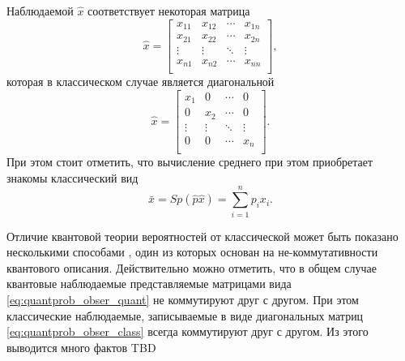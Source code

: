 Наблюдаемой $\hat{x}$ соответствует некоторая матрица
\begin{equation}
\hat{x} = \begin{bmatrix}
x_{11} & x_{12} & \cdots & x_{1n} \\
x_{21} & x_{22} & \cdots & x_{2n} \\
\vdots & \vdots & \ddots & \vdots \\
x_{n1} & x_{n2} & \cdots & x_{nn} \\
\end{bmatrix},
\label{eq:quantprob_obser_quant}
\end{equation}
которая в классическом случае является диагональной 
\begin{equation}
\hat{x} = \begin{bmatrix}
x_1 & 0 & \cdots & 0 \\
0 & x_2 & \cdots & 0 \\
\vdots & \vdots & \ddots & \vdots \\
0 & 0 & \cdots & x_n \\
\end{bmatrix}.
\label{eq:quantprob_obser_class}
\end{equation}
При этом стоит отметить, что вычисление среднего при этом приобретает
знакомы классический вид
\begin{equation}
\bar{x} = Sp\left(\hat{p} \hat{x}\right) = \sum_{i=1}^n p_i x_i.
\nonumber
\end{equation}

Отличие квантовой теории вероятностей от классической может быть
показано несколькими способами \cite{bHolevo2003, bHolevo2003add},
один из которых основан на не-коммутативности квантового описания.
Действительно можно отметить, что в общем случае квантовые наблюдаемые
представляемые матрицами вида \eqref{eq:quantprob_obser_quant} не
коммутируют друг с другом. При этом классические наблюдаемые,
записываемые в виде диагональных матриц
\eqref{eq:quantprob_obser_class} всегда коммутируют друг с другом. Из
этого выводится много фактов TBD


